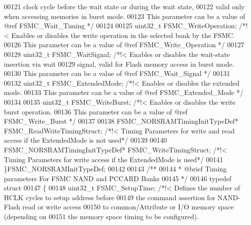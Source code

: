 \begin{DoxyCode}
00121 \textcolor{comment}{                                          clock cycle before the wait state or during the wait state,}
00122 \textcolor{comment}{                                          valid only when accessing memories in burst mode. }
00123 \textcolor{comment}{                                          This parameter can be a value of @ref FSMC\_Wait\_Timing */}
00124 
00125   uint32\_t FSMC_WriteOperation;      \textcolor{comment}{/*!< Enables or disables the write operation in the selected bank
       by the FSMC. }
00126 \textcolor{comment}{                                          This parameter can be a value of @ref FSMC\_Write\_Operation
       */}
00127 
00128   uint32\_t FSMC_WaitSignal;          \textcolor{comment}{/*!< Enables or disables the wait-state insertion via wait}
00129 \textcolor{comment}{                                          signal, valid for Flash memory access in burst mode. }
00130 \textcolor{comment}{                                          This parameter can be a value of @ref FSMC\_Wait\_Signal */}
00131 
00132   uint32\_t FSMC_ExtendedMode;        \textcolor{comment}{/*!< Enables or disables the extended mode.}
00133 \textcolor{comment}{                                          This parameter can be a value of @ref FSMC\_Extended\_Mode */}
00134 
00135   uint32\_t FSMC_WriteBurst;          \textcolor{comment}{/*!< Enables or disables the write burst operation.}
00136 \textcolor{comment}{                                          This parameter can be a value of @ref FSMC\_Write\_Burst */}
00137 
00138   FSMC\_NORSRAMTimingInitTypeDef* FSMC_ReadWriteTimingStruct; \textcolor{comment}{/*!< Timing Parameters for write and read
       access if the  ExtendedMode is not used*/}
00139 
00140   FSMC\_NORSRAMTimingInitTypeDef* FSMC_WriteTimingStruct;     \textcolor{comment}{/*!< Timing Parameters for write access
       if the  ExtendedMode is used*/}
00141 \}FSMC\_NORSRAMInitTypeDef;
00142 
00143 \textcolor{comment}{/** }
00144 \textcolor{comment}{  * @brief  Timing parameters For FSMC NAND and PCCARD Banks}
00145 \textcolor{comment}{  */}
00146 \textcolor{keyword}{typedef} \textcolor{keyword}{struct}
00147 \{
00148   uint32\_t FSMC_SetupTime;      \textcolor{comment}{/*!< Defines the number of HCLK cycles to setup address before}
00149 \textcolor{comment}{                                     the command assertion for NAND-Flash read or write access}
00150 \textcolor{comment}{                                     to common/Attribute or I/O memory space (depending on}
00151 \textcolor{comment}{                                     the memory space timing to be configured).}

\end{DoxyCode}
